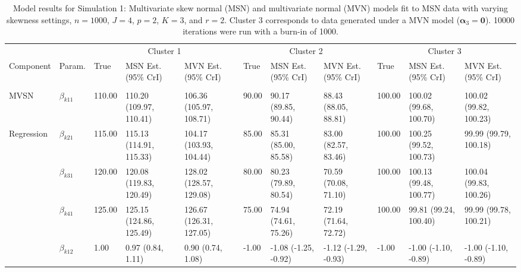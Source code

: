 \documentclass[useAMS,11pt]{article}
\newcommand{\1}{\mathbbm{1}}
\begin{document}
\newpage

\begin{landscape}\begin{table}[t]

\caption{\label{tab:sim1}Model results for Simulation 1: Multivariate skew normal (MSN) and multivariate normal (MVN) models fit to MSN data with varying skewness settings, $n = 1000$, $J = 4$, $p = 2$, $K = 3$, and $r = 2$. Cluster 3 corresponds to data generated under a MVN model ($\boldsymbol\alpha_3=\boldsymbol0$). 10000 iterations were run with a burn-in of 1000.}
\begin{center}
\fontsize{7}{9}\selectfont
\begin{tabular}{lllllllllll}
\toprule
\multicolumn{2}{c}{ } & \multicolumn{3}{c}{Cluster 1} & \multicolumn{3}{c}{Cluster 2} & \multicolumn{3}{c}{Cluster 3} \\
\cmidrule(l{3pt}r{3pt}){3-5} \cmidrule(l{3pt}r{3pt}){6-8} \cmidrule(l{3pt}r{3pt}){9-11}
Component & Param. & True & MSN Est. (95\% CrI) & MVN Est. (95\% CrI)  & True & MSN Est. (95\% CrI) & MVN Est. (95\% CrI) & True & MSN Est. (95\% CrI) & MVN Est. (95\% CrI)\\
\midrule
\addlinespace[0.3em]
\multicolumn{11}{l}{\textbf{ }}\\
\hspace{1em}MVSN & $\beta_{k11}$ & 110.00 & 110.20 (109.97, 110.41) & 106.36 (105.97, 108.71) & 90.00 & 90.17 (89.85, 90.44) & 88.43 (88.05, 88.81) & 100.00 & 100.02 (99.68, 100.70) & 100.02 (99.82, 100.23)\\
\hspace{1em}Regression & $\beta_{k21}$ & 115.00 & 115.13 (114.91, 115.33) & 104.17 (103.93, 104.44) & 85.00 & 85.31 (85.00, 85.58) & 83.00 (82.57, 83.46) & 100.00 & 100.25 (99.52, 100.73) & 99.99 (99.79, 100.18)\\
\hspace{1em} & $\beta_{k31}$ & 120.00 & 120.08 (119.83, 120.49) & 128.02 (128.57, 129.08) & 80.00 & 80.23 (79.89, 80.54) & 70.59 (70.08, 71.10) & 100.00 & 100.13 (99.48, 100.77) & 100.04 (99.83, 100.26)\\
\hspace{1em} & $\beta_{k41}$ & 125.00 & 125.15 (124.86, 125.49) & 126.67 (126.31, 127.05) & 75.00 & 74.94 (74.61, 75.26) & 72.19 (71.64, 72.72) & 100.00 & 99.81 (99.24, 100.40) & 99.99 (99.78, 100.21)\\
\hspace{1em} & $\beta_{k12}$ & 1.00 & 0.97 (0.84, 1.11) & 0.90 (0.74, 1.08) & -1.00 & -1.08 (-1.25, -0.92) & -1.12 (-1.29, -0.93) & -1.00 & -1.00 (-1.10, -0.89) & -1.00 (-1.10, -0.89)\\

\end{tabular}
\end{center}
\end{table}
\end{landscape}
\end{document}
